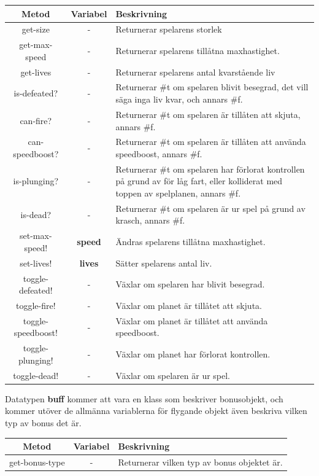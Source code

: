 \documentclass[12pt,a4paper]{article}
\newcounter{subsubsubsection}[subsubsection]
\begin{document}
\begin{tabular}{| c | c | p{7.8cm} |}
	\hline
	\textbf{Metod} & \textbf{Variabel} & \textbf{Beskrivning} \\
	\hline
	
	get-size & - & Returnerar spelarens storlek \\
	\hline	
	get-max-speed & - & Returnerar spelarens tillåtna maxhastighet. \\
	\hline
	get-lives & - & Returnerar spelarens antal kvarstående liv \\
	\hline
	is-defeated? & - & Returnerar \#t om spelaren blivit besegrad, det vill säga inga liv kvar, och annars \#f. \\
	\hline
	can-fire? & - & Returnerar \#t om spelaren är tillåten att skjuta, annars \#f.\\
	\hline
	can-speedboost? & - & Returnerar \#t om spelaren är tillåten att använda speedboost, annars \#f. \\
	\hline
	is-plunging? & - & Returnerar \#t om spelaren har förlorat kontrollen på grund av för låg fart, eller kolliderat med toppen av spelplanen, annars \#f. \\
	\hline
	is-dead? & - & Returnerar \#t om spelaren är ur spel på grund av krasch, annars \#f. \\
	\hline
	set-max-speed! & \small\textbf{speed} & Ändras spelarens tillåtna maxhastighet. \\
	\hline
	set-lives! & \small\textbf{lives} & Sätter spelarens antal liv. \\
	\hline
	toggle-defeated! & - & Växlar om spelaren har blivit besegrad. \\
	\hline
	toggle-fire! & - & Växlar om planet är tillåtet att skjuta.\\
	\hline
	toggle-speedboost! & - & Växlar om planet är tillåtet att använda speedboost. \\
	\hline
	toggle-plunging! & - & Växlar om planet har förlorat kontrollen. \\
	\hline
	toggle-dead! & - & Växlar om spelaren är ur spel. \\
	\hline
	
\end{tabular}

Datatypen \textbf{buff} kommer att vara en klass som beskriver bonusobjekt, och kommer utöver de allmänna variablerna för flygande objekt även beskriva vilken typ av bonus det är. \\

\begin{tabular}{| c | c | p{8.2cm} |}
	\hline
	\textbf{Metod} & \textbf{Variabel} & \textbf{Beskrivning} \\
	\hline

	get-bonus-type & - & Returnerar vilken typ av bonus objektet är. \\
	\hline
	
\end{tabular}
\end{document}
